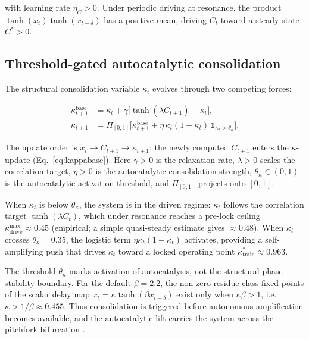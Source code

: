 with learning rate $\eta_C > 0$. Under periodic driving at resonance, the product $\tanh(x_t)\tanh(x_{t-\delta})$ has a positive mean, driving $C_t$ toward a steady state $C^* > 0$.

\subsection{Threshold-gated autocatalytic consolidation}

The structural consolidation variable $\kappa_t$ evolves through two competing forces:

\begin{align}
\kappa_{t+1}^{\mathrm{base}} &= \kappa_t + \gamma\big[\tanh(\lambda C_{t+1}) - \kappa_t\big], \label{eq:kappabase}\\
\kappa_{t+1} &= \Pi_{[0,1]}\Big[\kappa_{t+1}^{\mathrm{base}} + \eta\,\kappa_t(1-\kappa_t)\,\mathbf{1}_{\kappa_t > \theta_\kappa}\Big]. \label{eq:kapfull}
\end{align}

The update order is $x_t \to C_{t+1} \to \kappa_{t+1}$; the newly computed $C_{t+1}$ enters the $\kappa$-update (Eq.~\eqref{eq:kappabase}). Here $\gamma > 0$ is the relaxation rate, $\lambda > 0$ scales the correlation target, $\eta > 0$ is the autocatalytic consolidation strength, $\theta_\kappa \in (0,1)$ is the autocatalytic activation threshold, and $\Pi_{[0,1]}$ projects onto $[0,1]$.

When $\kappa_t$ is below $\theta_\kappa$, the system is in the driven regime: $\kappa_t$ follows the correlation target $\tanh(\lambda C_t)$, which under resonance reaches a pre-lock ceiling $\kappa_{\mathrm{drive}}^{\max} \approx 0.45$ (empirical; a simple quasi-steady estimate gives $\approx 0.48$). When $\kappa_t$ crosses $\theta_\kappa = 0.35$, the logistic term $\eta\kappa_t(1-\kappa_t)$ activates, providing a self-amplifying push that drives $\kappa_t$ toward a locked operating point $\kappa^*_{\mathrm{train}} \approx 0.963$.

The threshold $\theta_\kappa$ marks activation of autocatalysis, not the structural phase-stability boundary. For the default $\beta=2.2$, the non-zero residue-class fixed points of the scalar delay map $x_t = \kappa\tanh(\beta x_{t-\delta})$ exist only when $\kappa\beta > 1$, i.e.\ $\kappa > 1/\beta \approx 0.455$. Thus consolidation is triggered before autonomous amplification becomes available, and the autocatalytic lift carries the system across the pitchfork bifurcation \cite{strogatz2015nonlinear}.


